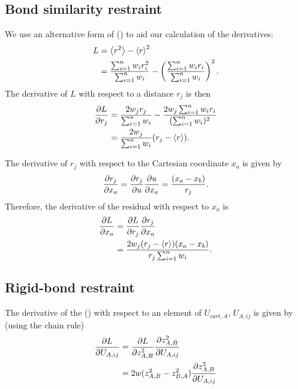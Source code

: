 \documentclass[pdf]{iucr}
\begin{document}
\subsection{Bond similarity restraint}
We use an alternative form of () to aid our calculation of the derivatives:
\begin{align}
L &= \left\langle r^2 \right\rangle - \left\langle r \right\rangle^2 \nonumber\\
&= \frac{\sum_{i = 1}^n {w_i r_i^2}}{\sum_{i = 1}^n {w_i}} - 
    \left(\frac{\sum_{i = 1}^n {w_i r_i}}{\sum_{i = 1}^n {w_i}}\right)^2.
\end{align}
The derivative of $L$ with respect to a distance $r_j$ is then
\begin{align}
\frac{\partial L}{\partial r_j} &=
  \frac{2 w_j r_j}{\sum_{i=1}^n{w_i}}
  - \frac{2 w_j \sum_{i=1}^n w_i r_i}{(\sum_{i=1}^n w_i)^2}\nonumber\\
&= \frac{2 w_j}{\sum_{i=1}^n{w_i}}(r_j - \left\langle r \right\rangle).
\end{align}

The derivative of $r_j$ with respect to the Cartesian coordinate $x_a$ is given by
\begin{equation}
\frac{\partial r_j}{\partial x_a} = \frac{\partial r_j}{\partial u} \frac{\partial u}{\partial x_a}= \frac{(x_a - x_b)}{r_j}.
\end{equation}
Therefore, the derivative of the residual with respect to $x_a$ is
\begin{align}
\frac{\partial L}{\partial x_a} &= \frac{\partial L}{\partial r_j} \frac{\partial r_j}{\partial x_a}\nonumber\\
&= \frac{2 w_j (r_j - \left\langle r \right\rangle)(x_a - x_b)}{r_j \sum_{i=1}^n {w_i}}.
\end{align}

\subsection{Rigid-bond restraint}

The derivative of the () with respect to an element of $U_{cart,A}$,
$U_{A,ij}$ is given by (using the chain rule)
\begin{align}
\frac{\partial L}{\partial U_{A,ij}} &= \frac{\partial L}{\partial z^2_{A,B}} \frac{\partial z^2_{A,B}}{\partial U_{A,ij}}\\
&=2w(z^2_{A,B} - z^2_{B,A}) \frac{\partial z^2_{A,B}}{\partial U_{A,ij}}\label{eqn:u_derivative}
\end{align}
\end{document}
